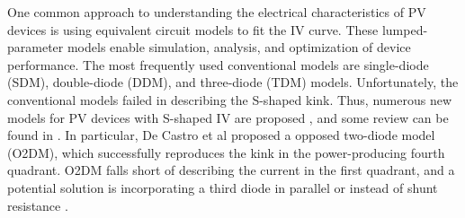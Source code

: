 \documentclass[a4paper,fleqn]{cas-dc}
\begin{document}

One common approach to understanding the electrical characteristics of PV devices 
is using equivalent circuit models to fit the IV curve. 
These lumped-parameter models enable simulation, analysis, and optimization of device performance. 
The most frequently used conventional models are single-diode (SDM), double-diode (DDM), and three-diode (TDM) models.
Unfortunately, the conventional models failed in describing the S-shaped kink.
Thus, numerous new models for PV devices with S-shaped IV are proposed \cite{Mazhari2006,Yu2019,Sesa2019,Gaur2014}, and
some review can be found in \cite{SshapeRewShot,GarciaSanchez2017}.
In particular, De Castro et al \cite{Castro2010} proposed a opposed two-diode model (O2DM),
which successfully reproduces the kink in the power-producing fourth quadrant.
O2DM falls short of describing the current in the first quadrant, 
and a potential solution is incorporating a third diode in parallel \cite{DeCastro2016,Roland2016}
or instead of shunt resistance \cite{GarciaSanchez2013}. 
\end{document}
